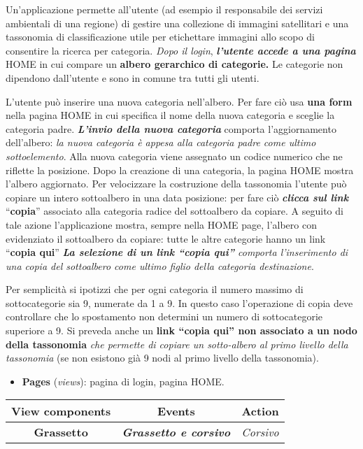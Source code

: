 Un'applicazione permette all'utente (ad esempio il responsabile dei
servizi ambientali di una regione) di gestire una collezione di immagini
satellitari e una tassonomia di classificazione utile per etichettare
immagini allo scopo di consentire la ricerca per categoria. \emph{Dopo
il login}, \textbf{\emph{l'utente accede a una pagina}} HOME in cui
compare un \textbf{albero gerarchico di categorie.} Le categorie non
dipendono dall'utente e sono in comune tra tutti gli utenti.

L'utente può inserire una nuova categoria nell'albero. Per fare ciò usa
\textbf{una form} nella pagina HOME in cui specifica il nome della nuova
categoria e sceglie la categoria padre. \textbf{\emph{L'invio della
nuova categoria}} comporta l'aggiornamento dell'albero: \emph{la nuova
categoria è appesa alla categoria padre come ultimo sottoelemento}. Alla
nuova categoria viene assegnato un codice numerico che ne riflette la
posizione. Dopo la creazione di una categoria, la pagina HOME mostra
l'albero aggiornato. Per velocizzare la costruzione della tassonomia
l'utente può copiare un intero sottoalbero in una data posizione: per
fare ciò \textbf{\emph{clicca sul link}} ``\textbf{copia}'' associato
alla categoria radice del sottoalbero da copiare. A seguito di tale
azione l'applicazione mostra, sempre nella HOME page, l'albero con
evidenziato il sottoalbero da copiare: tutte le altre categorie hanno un
link ``\textbf{copia qui}'' \emph{\textbf{La selezione di un link
``copia qui''} comporta l'inserimento di una copia del sottoalbero come
ultimo figlio della categoria destinazione}.

Per semplicità si ipotizzi che per ogni categoria il numero massimo di
sottocategorie sia 9, numerate da 1 a 9. In questo caso l'operazione di
copia deve controllare che lo spostamento non determini un numero di
sottocategorie superiore a 9. Si preveda anche un \textbf{link ``copia
qui'' non associato a un nodo della tassonomia} \emph{che permette di
copiare un sotto-albero al primo livello della tassonomia} (se non
esistono già 9 nodi al primo livello della tassonomia).

\begin{itemize}
\tightlist
\item
  \textbf{Pages} (\emph{views}): pagina di login, pagina HOME.
\end{itemize}

\begin{longtable}[]{@{}ccc@{}}
\toprule()
View components & Events & Action \\
\midrule()
\endhead
\textbf{Grassetto} & \textbf{\emph{Grassetto e corsivo}} &
\emph{Corsivo} \\
\bottomrule()
\end{longtable}

